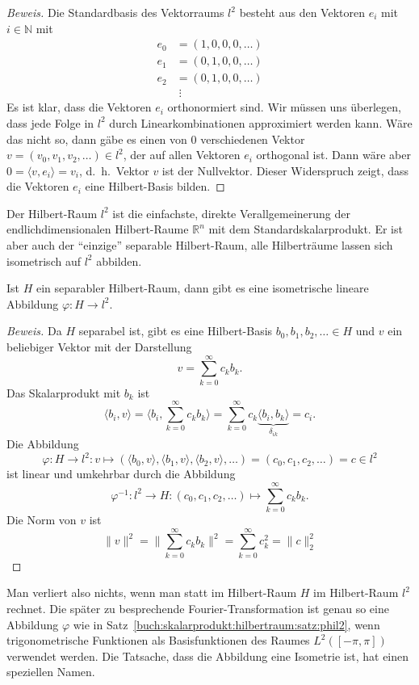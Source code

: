 \begin{proof}[Beweis]
Die Standardbasis des Vektorraums $l^2$ besteht aus den Vektoren $e_i$
mit $i\in\mathbb{N}$ mit 
\begin{align*}
e_0 &= (1,0,0,0,\dots)
\\
e_1 &= (0,1,0,0,\dots)
\\
e_2 &= (0,1,0,0,\dots)
\\  &\;\vdots
\end{align*}
Es ist klar, dass die Vektoren $e_i$ orthonormiert sind.
Wir müssen uns überlegen, dass jede Folge in $l^2$ durch Linearkombinationen
approximiert werden kann.
Wäre das nicht so, dann gäbe es einen von $0$ verschiedenen
Vektor $v=(v_0,v_1,v_2,\dots)\in l^2$, der auf allen Vektoren $e_i$
orthogonal ist.
Dann wäre aber $0=\langle v,e_i\rangle = v_i$, d.~h.~Vektor $v$ ist der
Nullvektor.
Dieser Widerspruch zeigt, dass die Vektoren $e_i$ eine Hilbert-Basis
bilden.
\end{proof}

Der Hilbert-Raum $l^2$ ist die einfachste, direkte Verallgemeinerung der
endlichdimensionalen Hilbert-Raume $\mathbb{R}^n$ mit dem Standardskalarprodukt.
Er ist aber auch der ``einzige'' separable Hilbert-Raum, alle Hilberträume
lassen sich isometrisch auf $l^2$ abbilden.

\begin{satz}
\label{buch:skalarprodukt:hilbertraum:satz:phil2}
Ist $H$ ein separabler Hilbert-Raum, dann gibt es eine isometrische
lineare Abbildung $\varphi\colon H\to l^2$.
\end{satz}

\begin{proof}[Beweis]
Da $H$ separabel ist, gibt es eine Hilbert-Basis $b_0,b_1,b_2,\ldots\in H$
und $v$ ein beliebiger Vektor mit der Darstellung
\[
v = \sum_{k=0}^\infty c_kb_k.
\]
Das Skalarprodukt mit $b_k$ ist
\[
\langle b_i,v\rangle
=
\biggl\langle b_i,\sum_{k=0}^\infty c_kb_k\biggr\rangle
=
\sum_{k=0}^\infty c_k \underbrace{\langle b_i,b_k\rangle}_{\delta_{ik}}
=
c_i.
\]
Die Abbildung
\[
\varphi\colon H \to l^2
:
v \mapsto (\langle b_0,v\rangle,\langle b_1,v\rangle,\langle b_2,v\rangle,\dots)
=
(c_0,c_1,c_2,\dots)=c\in l^2
\]
ist linear und umkehrbar durch die Abbildung
\[
\varphi^{-1} \colon l^2 \to H
:
(c_0,c_1,c_2,\dots) \mapsto \sum_{k=0}^\infty c_k b_k.
\]
Die Norm von $v$ ist
\[
\|v\|^2
=
\biggl\|
\sum_{k=0}^\infty c_k b_k
\biggr\|^2
=
\sum_{k=0}^\infty c_k^2
=
\|c\|_2^2
\]
\end{proof}

Man verliert also nichts, wenn man statt im Hilbert-Raum $H$ im
Hilbert-Raum $l^2$ rechnet.
Die später zu besprechende Fourier-Transformation ist genau
so eine Abbildung $\varphi$ wie in
Satz~\ref{buch:skalarprodukt:hilbertraum:satz:phil2}, wenn 
trigonometrische Funktionen als Basisfunktionen des Raumes
$L^2([-\pi,\pi])$ verwendet werden.
Die Tatsache, dass die Abbildung eine Isometrie ist, hat einen
speziellen Namen.

